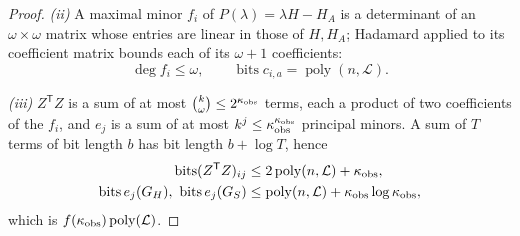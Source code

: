 \begin{proof}
\emph{(ii)} A maximal minor $f_i$ of $P(\lambda)=\lambda H-H_A$ is a determinant
of an $\omega\times\omega$ matrix whose entries are linear in those of $H,H_A$;
Hadamard applied to its coefficient matrix bounds each of its $\omega+1$
coefficients:
\begin{equation*}
\deg f_i\le\omega,\qquad
\operatorname{bits}c_{i,a}=\operatorname{poly}(n,\mathcal L).
\end{equation*}

\emph{(iii)} $Z^{\mathsf T}Z$ is a sum of at most
$\binom{k}{\omega}\le2^{\kappa_{\rm obs}}$ terms, each a product of two
coefficients of the $f_i$, and $e_j$ is a sum of at most
$k^{j}\le\kappa_{\rm obs}^{\kappa_{\rm obs}}$ principal minors. A sum of $T$
terms of bit length $b$ has bit length $b+\log T$, hence
\begin{equation*}
\begin{aligned}
\operatorname{bits}(Z^{\mathsf T}Z)_{ij}
&\le2\operatorname{poly}(n,\mathcal L)+\kappa_{\rm obs},\\
\operatorname{bits}e_j(G_H),\ \operatorname{bits}e_j(G_S)
&\le\operatorname{poly}(n,\mathcal L)+\kappa_{\rm obs}\log\kappa_{\rm obs},
\end{aligned}
\end{equation*}
which is $f(\kappa_{\rm obs})\operatorname{poly}(\mathcal L)$.
\end{proof}

